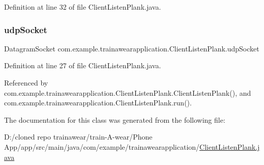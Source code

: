 Definition at line 32 of file Client\+Listen\+Plank.\+java.

\mbox{\label{classcom_1_1example_1_1trainawearapplication_1_1_client_listen_plank_a1834dc9b799cdf87ebf89fd34136ccfa}} 
\subsubsection{\texorpdfstring{udpSocket}{udpSocket}}
{\footnotesize\ttfamily Datagram\+Socket com.\+example.\+trainawearapplication.\+Client\+Listen\+Plank.\+udp\+Socket\hspace{0.3cm}{\ttfamily [private]}}



Definition at line 27 of file Client\+Listen\+Plank.\+java.



Referenced by com.\+example.\+trainawearapplication.\+Client\+Listen\+Plank.\+Client\+Listen\+Plank(), and com.\+example.\+trainawearapplication.\+Client\+Listen\+Plank.\+run().



The documentation for this class was generated from the following file\+:\begin{DoxyCompactItemize}
\item 
D\+:/cloned repo trainawear/train-\/\+A-\/wear/\+Phone App/app/src/main/java/com/example/trainawearapplication/\mbox{\hyperlink{_client_listen_plank_8java}{Client\+Listen\+Plank.\+java}}\end{DoxyCompactItemize}
